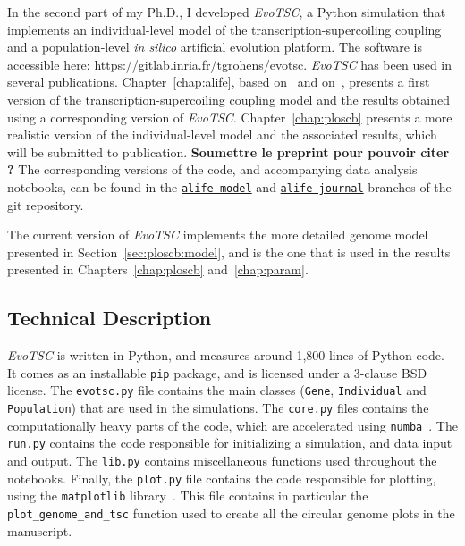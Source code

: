 In the second part of my Ph.D., I developed \emph{EvoTSC}, a Python simulation that implements an individual-level model of the transcription-supercoiling coupling and a population-level \emph{in silico} artificial evolution platform.
The software is accessible here: \url{https://gitlab.inria.fr/tgrohens/evotsc}.
\emph{EvoTSC} has been used in several publications.
Chapter~\ref{chap:alife}, based on~\cite{grohens2021} and on~\cite{grohens2022a}, presents a first version of the transcription-supercoiling coupling model and the results obtained using a corresponding version of \emph{EvoTSC}.
Chapter~\ref{chap:ploscb} presents a more realistic version of the individual-level model and the associated results, which will be submitted to publication.
\textbf{Soumettre le preprint pour pouvoir citer ?}
The corresponding versions of the code, and accompanying data analysis notebooks, can be found in the \href{https://gitlab.inria.fr/tgrohens/evotsc/-/tree/alife-model}{\texttt{alife-model}} \citep{grohens2021} and \href{https://gitlab.inria.fr/tgrohens/evotsc/-/tree/alife-journal}{\texttt{alife-journal}} \citep{grohens2022a} branches of the git repository.

The current version of \emph{EvoTSC} implements the more detailed genome model presented in Section~\ref{sec:ploscb:model}, and is the one that is used in the results presented in Chapters~\ref{chap:ploscb} and~\ref{chap:param}.

\subsection{Technical Description}

\emph{EvoTSC} is written in Python, and measures around 1,800 lines of Python code.
It comes as an installable \texttt{pip} package, and is licensed under a 3-clause BSD license.
The \texttt{evotsc.py} file contains the main classes (\texttt{Gene}, \texttt{Individual} and \texttt{Population}) that are used in the simulations.
The \texttt{core.py} files contains the computationally heavy parts of the code, which are accelerated using \texttt{numba}~\citep{lam2015}.
The \texttt{run.py} contains the code responsible for initializing a simulation, and data input and output.
The \texttt{lib.py} contains miscellaneous functions used throughout the notebooks.
Finally, the \texttt{plot.py} file contains the code responsible for plotting, using the \texttt{matplotlib} library~\citep{hunter2007}.
This file contains in particular the \texttt{plot\_genome\_and\_tsc} function used to create all the circular genome plots in the manuscript.


